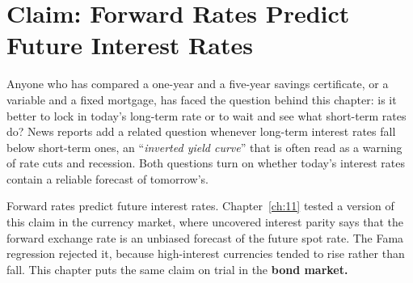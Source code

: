 \makeatletter
{}
\makeatother

\makeatletter
\makeatother

\chapter{Claim: Forward Rates Predict Future Interest Rates}
\label{ch:12}
\providecommand{\term}[1]{\emph{#1}}

Anyone who has compared a one-year and a five-year savings certificate, or a variable and a fixed mortgage, has faced the question behind this chapter: is it better to lock in today's long-term rate or to wait and see what short-term rates do? News reports add a related question whenever long-term interest rates fall below short-term ones, an ``\term{inverted yield curve}'' that is often read as a warning of rate cuts and recession. Both questions turn on whether today's interest rates contain a reliable forecast of tomorrow's.

Forward rates predict future interest rates. Chapter~\ref{ch:11} tested a version of this claim in the currency market, where uncovered interest parity says that the forward exchange rate is an unbiased forecast of the future spot rate. The Fama regression rejected it, because high-interest currencies tended to rise rather than fall. This chapter puts the same claim on trial in the \textbf{bond market.}

